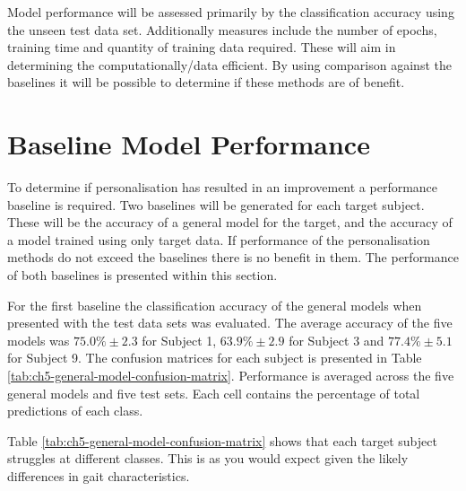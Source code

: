 Model performance will be assessed primarily by the classification accuracy using the unseen test data set. Additionally measures include the number of epochs, training time and quantity of training data required. These will aim in determining the computationally/data efficient. By using comparison against the baselines it will be possible to determine if these methods are of benefit.


\section{Baseline Model Performance}
\label{sec:personalisation-baseline-model-results}
To determine if personalisation has resulted in an improvement a performance baseline is required. Two baselines will be generated for each target subject. These will be the accuracy of a general model for the target, and the accuracy of a model trained using only target data. If performance of the personalisation methods do not exceed the baselines there is no benefit in them. The performance of both baselines is presented within this section.

For the first baseline the classification accuracy of the general models when presented with the test data sets was evaluated. The average accuracy of the five models was $75.0\%\pm2.3$ for Subject 1, $63.9\%\pm2.9$ for Subject 3 and $77.4\%\pm5.1$ for Subject 9. The confusion matrices for each subject is presented in Table \ref{tab:ch5-general-model-confusion-matrix}. Performance is averaged across the five general models and five test sets. Each cell contains the percentage of total predictions of each class.

Table \ref{tab:ch5-general-model-confusion-matrix} shows that each target subject struggles at different classes. This is as you would expect given the likely differences in gait characteristics.

